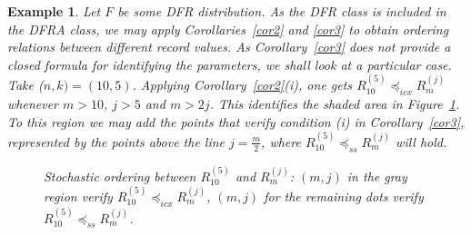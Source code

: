 \documentclass [11pt]{article}
\newtheorem{example}{Example}
\begin{document}
\begin{example}
Let $F$ be some DFR distribution. As the DFR class is included in the DFRA class, we may apply Corollaries~\ref{cor2} and \ref{cor3} to obtain ordering relations between different record values. As Corollary~\ref{cor3} does not provide a closed formula for identifying the parameters, we shall look at a particular case. Take ($n,k)=(10,5)$. Applying Corollary~\ref{cor2}(i), one gets $R_{10}^{(5)} \preceq_{icx} R_m^{(j)}$ whenever $m>10$, $j>5$ and $m>2j$. This identifies the shaded area in Figure~\ref{fig1}. To this region we may add the points that verify condition (i) in Corollary~\ref{cor3}, represented by the points above the line $j=\frac{m}2$, where $R_{10}^{(5)} \preceq_{ss} R_m^{(j)}$ will hold.
\begin{figure}[h]
\centering
{}
\caption{Stochastic ordering between $R_{10}^{(5)}$ and $R_m^{(j)}$: $(m,j)$ in the gray region verify $R_{10}^{(5)} \preceq_{icx} R_m^{(j)}$, $(m,j)$ for the remaining dots verify $R_{10}^{(5)} \preceq_{ss} R_m^{(j)}$.}
\label{fig1}
\end{figure}
\end{example}
\end{document}
